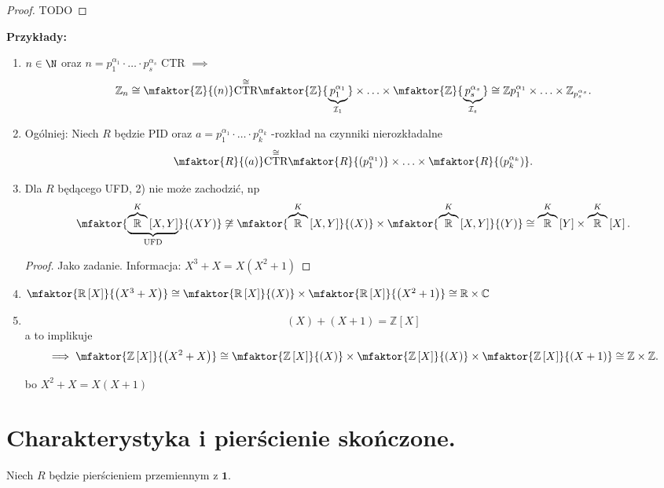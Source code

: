 \begin{proof}
	TODO
\end{proof} 
\noindent \textbf{Przykłady:} 
\begin{enumerate}[label=\arabic*)]
	\item $n\in \N$ oraz $n=p_1^{\alpha_1}\cdot \ldots \cdot p_{s}^{\alpha_{s}}$ CTR $\implies$
		\[
		\mathbb{Z} _{n} \cong \mfaktor{\mathbb{Z} }{(n)} \overset{\cong }{\text{CTR}} \mfaktor{\mathbb{Z} }{\underbrace{p_1^{\alpha_1}}_{\mathcal{I}_{1}}} \times \ldots \times \mfaktor{\mathbb{Z} }{\underbrace{p_{s}^{\alpha_{s}}}_{\mathcal{I}_{s}}} \cong \mathbb{Z} p_1^{\alpha_1} \times \ldots \times \mathbb{Z}_{p_{s}^{\alpha _{s}}}  
		.\] 
	\item Ogólniej: Niech $R$ będzie PID   oraz $a = p_1^{\alpha_1}\cdot \ldots \cdot p_{k}^{\alpha_{k}}$ -rozkład na czynniki nierozkładalne
		\[
		\mfaktor{R}{(a)} \overset{\cong }{\text{CTR}} \mfaktor{R}{\left( p_1^{\alpha_1} \right) } \times \ldots \times \mfaktor{R}{\left( p_{k}^{\alpha_{k}} \right) } 
		.\] 
	\item Dla $R$ będącego UFD, 2) nie może zachodzić, np
		\[
		\mfaktor{\underbrace{\overbrace{\mathbb{R} }^{K}\left[ X,Y \right] }_{\text{UFD}}}{(XY)} \not\cong \mfaktor{\overbrace{\mathbb{R} }^{K}\left[ X,Y \right] }{(X)} \times \mfaktor{\overbrace{\mathbb{R} }^{K}\left[ X,Y \right] }{(Y)} \cong \overbrace{\mathbb{R} }^{K}\left[ Y \right] \times \overbrace{\mathbb{R} }^{K}\left[ X \right] 
		.\] 
		\begin{proof}
			Jako zadanie.
			Informacja: $X^3+X = X\left( X^2+1 \right) $
		\end{proof} 
	\item $\mfaktor{\mathbb{R} \left[ X \right] }{\left( X^3+X \right) } \cong \mfaktor{\mathbb{R} \left[ X \right] }{\left( X \right) } \times \mfaktor{\mathbb{R} \left[ X \right] }{\left( X^2+1 \right) } \cong \mathbb{R} \times \mathbb{C} $
	\item 
		\[\left( X \right) + \left( X+1 \right) = \mathbb{Z} \left[ X \right]\] 
		a to implikuje
		\[
		\implies \mfaktor{\mathbb{Z} \left[ X \right] }{\left( X^2+X \right) } \cong \mfaktor{\mathbb{Z} \left[ X \right] }{\left( X \right) } \times \mfaktor{\mathbb{Z} \left[ X \right] }{\left( X \right) } \times \mfaktor{\mathbb{Z} \left[ X \right] }{\left( X+1 \right) } \cong \mathbb{Z} \times \mathbb{Z} .\]

		bo $X^2+X= X\left( X+1 \right) $
\end{enumerate}
\section{Charakterystyka i pierścienie skończone.}
Niech $R$ będzie pierścieniem przemiennym z $\mathbf{1}$.

